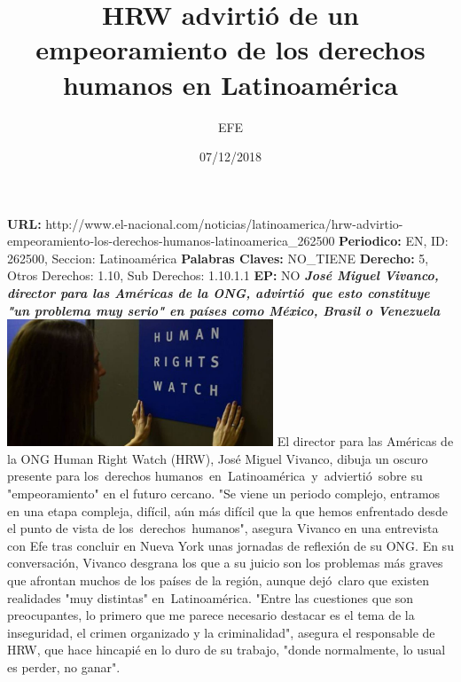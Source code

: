 \documentclass{article}%
\title{\textbf{HRW advirtió de un empeoramiento de los derechos humanos en Latinoamérica}}%
\author{EFE}%
\date{07/12/2018}%
\begin{document}
%
\normalsize%
\maketitle%
\textbf{URL: }%
http://www.el{-}nacional.com/noticias/latinoamerica/hrw{-}advirtio{-}empeoramiento{-}los{-}derechos{-}humanos{-}latinoamerica\_262500\newline%
%
\textbf{Periodico: }%
EN, %
ID: %
262500, %
Seccion: %
Latinoamérica\newline%
%
\textbf{Palabras Claves: }%
NO\_TIENE\newline%
%
\textbf{Derecho: }%
5, %
Otros Derechos: %
1.10, %
Sub Derechos: %
1.10.1.1\newline%
%
\textbf{EP: }%
NO\newline%
\newline%
%
\textbf{\textit{José Miguel Vivanco, director para las Américas de la ONG, advirtió~que esto constituye "un problema muy serio" en países como México, Brasil o Venezuela}}%
\newline%
\newline%
%
\includegraphics[width=300px]{189.jpg}%
\newline%
%
El director para las Américas de la ONG Human Right Watch (HRW), José Miguel Vivanco, dibuja un oscuro presente para los~derechos humanos~en~Latinoamérica~y~adviertió~sobre su "empeoramiento" en el futuro cercano.%
\newline%
%
"Se viene un periodo complejo, entramos en una etapa compleja, difícil, aún más difícil que la que hemos enfrentado desde el punto de vista de los~derechos~humanos", asegura Vivanco en una entrevista con Efe tras concluir en Nueva York unas jornadas de reflexión de su ONG.%
\newline%
%
En su conversación, Vivanco desgrana los que a su juicio son los problemas más graves que afrontan muchos de los países de la región, aunque dejó~claro que existen realidades "muy distintas" en~Latinoamérica.%
\newline%
%
"Entre las cuestiones que son preocupantes, lo primero que me parece necesario destacar es el tema de la inseguridad, el crimen organizado y la criminalidad", asegura el responsable de HRW, que hace hincapié en lo duro de su trabajo, "donde normalmente, lo usual es perder, no ganar".%
\end{document}
